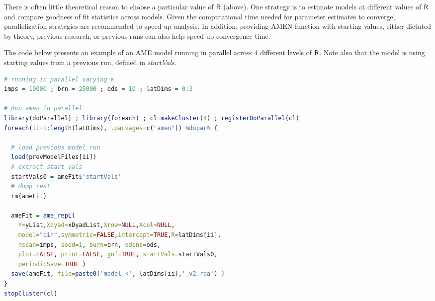 There is often little theoretical reason to choose a particular value of $\sf{R}$ (above). One strategy is to estimate models at different values of $\sf{R}$ and compare goodness of fit statistics across models. Given the computational time needed for parameter estimates to converge, parallelization strategies are recommended to speed up analysis. In addition, providing AMEN function with starting values, either dictated by theory, previous research, or previous runs can also help speed up convergence time.

The code below presents an example of an AME model running in parallel across 4 different levels of $\sf{R}$. Note also that the model is using starting values from a previous run, defined in \textit{startVals}.

\begin{lstlisting}[language=R]
# running in parallel varying k
imps = 10000 ; brn = 25000 ; ods = 10 ; latDims = 0:3

# Run amen in parallel
library(doParallel) ; library(foreach) ; cl=makeCluster(4) ; registerDoParallel(cl)
foreach(ii=1:length(latDims), .packages=c("amen")) %dopar% {

  # load previous model run
  load(prevModelFiles[ii])
  # extract start vals
  startVals0 = ameFit$'startVals'
  # dump rest
  rm(ameFit)

  ameFit = ame_repL(
    Y=yList,Xdyad=xDyadList,Xrow=NULL,Xcol=NULL,
    model="bin",symmetric=FALSE,intercept=TRUE,R=latDims[ii],
    nscan=imps, seed=1, burn=brn, odens=ods,
    plot=FALSE, print=FALSE, gof=TRUE, startVals=startVals0,
    periodicSave=TRUE )
  save(ameFit, file=paste0('model_k', latDims[ii],'_v2.rda') )
}
stopCluster(cl)
\end{lstlisting}
